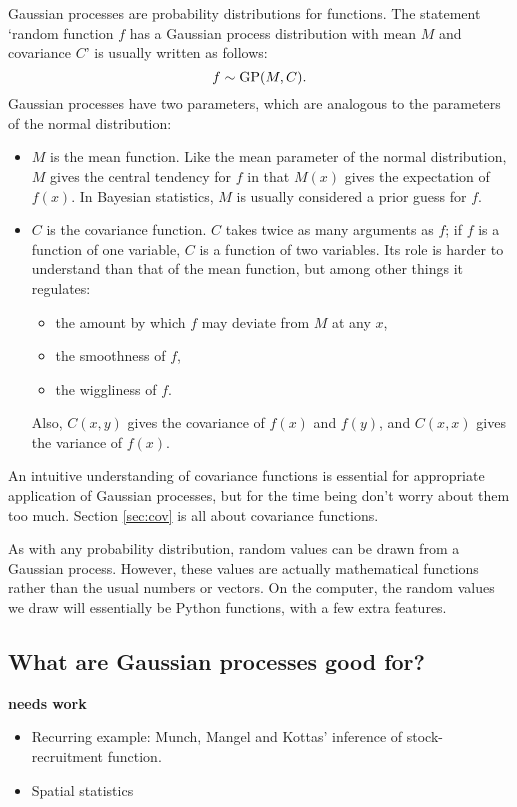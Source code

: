 \documentclass{manual}
\begin{document}
Gaussian processes are probability distributions for functions. The statement `random function $f$ has a Gaussian process distribution with mean $M$ and covariance $C$' is usually written as follows:
\begin{equation}
    f\sim\textup{GP}(M,C).
\end{equation}
Gaussian processes have two parameters, which are analogous to the parameters of the normal distribution:
\begin{itemize}
    \item $M$ is the mean function. Like the mean parameter of the normal distribution, $M$ gives the central tendency for $f$ in that $M(x)$ gives the expectation of $f(x)$. In Bayesian statistics, $M$ is usually considered a prior guess for $f$.
    \item $C$ is the covariance function. $C$ takes twice as many arguments as $f$; if $f$ is a function of one variable, $C$ is a function of two variables. Its role is harder to understand than that of the mean function, but among other things it regulates:
    \begin{itemize}
        \item the amount by which $f$ may deviate from $M$ at any $x$,
        \item the smoothness of $f$,
        \item the wiggliness of $f$.
    \end{itemize}
Also, $C(x,y)$ gives the covariance of $f(x)$ and $f(y)$, and $C(x,x)$ gives the variance of $f(x)$.
\end{itemize}
An intuitive understanding of covariance functions is essential for appropriate application of Gaussian processes, but for the time being don't worry about them too much. Section \ref{sec:cov} is all about covariance functions.

As with any probability distribution, random values can be drawn from a Gaussian process. However, these values are actually mathematical functions rather than the usual numbers or vectors. On the computer, the random values we draw will essentially be Python functions, with a few extra features.

\subsection{What are Gaussian processes good for?}\label{sub:applications}
\textbf{needs work}
\begin{itemize}
	\item Recurring example: Munch, Mangel and Kottas' inference of stock-recruitment function.
	\item Spatial statistics
\end{itemize}
\end{document}
